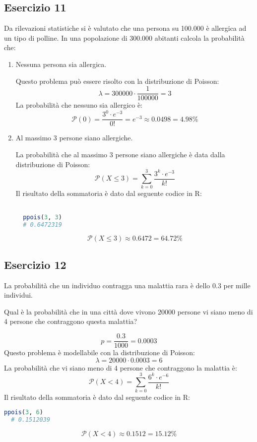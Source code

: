 \documentclass[a4paper]{article}
\theoremstyle{break}
\theoremstyle{break}
\theoremstyle{break}
\theoremstyle{break}
\begin{document}
\subsection{Esercizio 11}
Da rilevazioni statistiche si è valutato che una persona su 100.000 è allergica ad un
tipo di polline. In una popolazione di 300.000 abitanti calcola la probabilità che:
\begin{enumerate}
	\item Nessuna persona sia allergica.

    \vspace{1em}
    \noindent Questo problema può essere risolto con la distribuzione di Poisson:
    \[
      \lambda = 300000 \cdot \frac{1}{100000} = 3
    \] 
    La probabilità che nessuno sia allergico è:
    \[
      \mathcal{P}(0) = \frac{3^0 \cdot e^{-3}}{0!} = e^{-3} \approx 0.0498 = 4.98\%
    \] 
	\item Al massimo 3 persone siano allergiche.

    \vspace{1em}
    \noindent La probabilità che al massimo 3 persone siano allergiche è data dalla 
    distribuzione di Poisson:
    \[
      \mathcal{P}(X \le 3) = \sum_{k=0}^{3} \frac{3^k \cdot e^{-3}}{k!}
    \] 
    Il risultato della sommatoria è dato dal seguente codice in R:
    \begin{lstlisting}[language=R]

  ppois(3, 3)
  # 0.6472319
    \end{lstlisting}
    \[
    \mathcal{P}(X \le 3) \approx 0.6472 = 64.72\%
    \] 
\end{enumerate}

\subsection{Esercizio 12}
La probabilità che un individuo contragga una malattia rara è dello 0.3 per mille individui.

\noindent Qual è la probabilità che in una città dove vivono 20000 persone vi siano meno 
di 4 persone che contraggono questa malattia?

\[
  p = \frac{0.3}{1000} = 0.0003
\] 
Questo problema è modellabile con la distribuzione di Poisson:
\[
  \lambda = 20000 \cdot 0.0003 = 6
\]
La probabilità che vi siano meno di 4 persone che contraggono la malattia è:
\[
  \mathcal{P}(X < 4) = \sum_{k=0}^{3} \frac{6^k \cdot e^{-6}}{k!}
\]
Il risultato della sommatoria è dato dal seguente codice in R:
\begin{lstlisting}[language=R]
  ppois(3, 6)
  # 0.1512039
\end{lstlisting}
\[
  \mathcal{P}(X < 4) \approx 0.1512 = 15.12\%
\]
\end{document}
